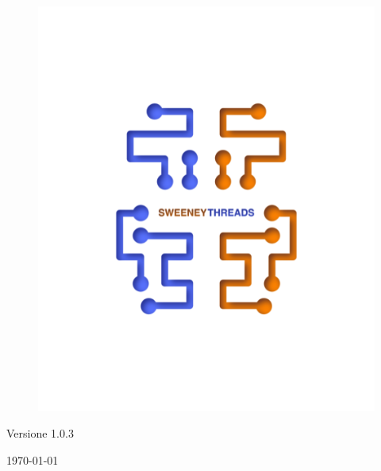 \documentclass[a4paper]{report}
\begin{document}
\begin{titlepage}
		\begin{figure}[H]
		\centering
			\includegraphics[scale=0.8]{sweeney.png}
		\end{figure}
		\begin{center}
			Versione 1.0.3
		\end{center}
		{\large \today}\\[3cm] 
		\vfill  
	\end{titlepage}
	
	
	
\end{document}
